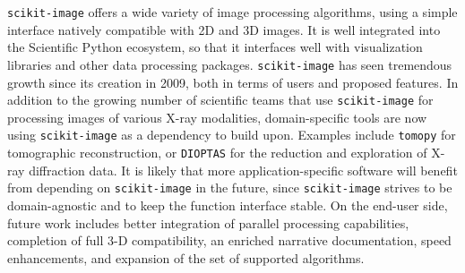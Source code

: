 \documentclass[twocolumn]{bmcart}%
\begin{document}
\texttt{scikit-image} offers a wide variety of image processing
algorithms, using a simple interface natively compatible with 2D and 3D
images. It is well integrated into the Scientific Python ecosystem, so
that it interfaces well with visualization libraries and other data
processing packages. \texttt{scikit-image} has seen tremendous growth
since its creation in 2009, both in terms of users and proposed features.
In addition to the growing number of scientific teams that use
\texttt{scikit-image} for processing images of various X-ray modalities,
domain-specific tools are now using \texttt{scikit-image} as a dependency
to build upon. Examples include \texttt{tomopy} \citep{Gursoy2014} for
tomographic reconstruction, or \texttt{DIOPTAS} \citep{Prescher2015} for
the reduction and exploration of X-ray diffraction data. It is likely
that more application-specific software will benefit from depending on
\texttt{scikit-image} in the future, since \texttt{scikit-image} strives
to be domain-agnostic and to keep the function interface stable. On the end-user
side, future work includes better integration of parallel processing
capabilities, completion of full 3-D compatibility, an enriched narrative
documentation, speed enhancements, and expansion of the set of supported algorithms.

\end{document}
